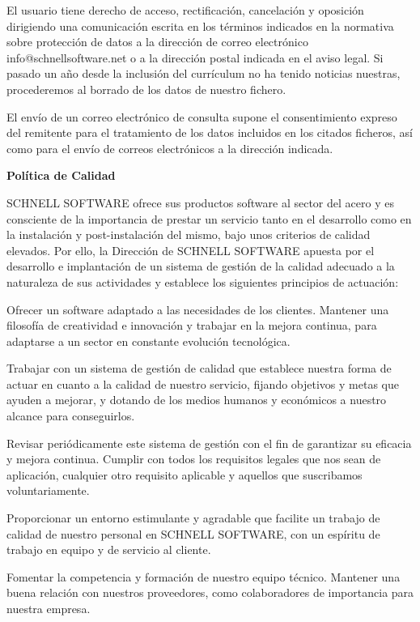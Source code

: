 \documentclass[10pt,a4paper]{article}
\begin{document}
\begin{enumerate}
El usuario tiene derecho de acceso, rectificación, cancelación y oposición dirigiendo una comunicación escrita en los términos indicados en la normativa sobre protección de datos a la dirección de correo electrónico info@schnellsoftware.net o a la dirección postal indicada en el aviso legal. Si pasado un año desde la inclusión del currículum no ha tenido noticias nuestras, procederemos al borrado de los datos de nuestro fichero.

El envío de un correo electrónico de consulta supone el consentimiento expreso del remitente para el tratamiento de los datos incluidos en los citados ficheros, así como para el envío de correos electrónicos a la dirección indicada.

\textbf{Política de Calidad}

SCHNELL SOFTWARE ofrece sus productos software al sector del acero y es consciente de la importancia de prestar un servicio tanto en el desarrollo como en la instalación y post-instalación del mismo, bajo unos criterios de calidad elevados.
Por ello, la Dirección de SCHNELL SOFTWARE apuesta por el desarrollo e implantación de un sistema de gestión de la calidad adecuado a la naturaleza de sus actividades y establece los siguientes principios de actuación:

Ofrecer un software adaptado a las necesidades de los clientes.
Mantener una filosofía de creatividad e innovación y trabajar en la mejora continua, para adaptarse a un sector en constante evolución tecnológica.

Trabajar con un sistema de gestión de calidad que establece nuestra forma de actuar en cuanto a la calidad de nuestro servicio, fijando objetivos y metas que ayuden a mejorar, y dotando de los medios humanos y económicos a nuestro alcance para conseguirlos.

Revisar periódicamente este sistema de gestión con el fin de garantizar su eficacia y mejora continua. 
Cumplir con todos los requisitos legales que nos sean de aplicación, cualquier otro requisito aplicable y aquellos que suscribamos voluntariamente.

Proporcionar un entorno estimulante y agradable que facilite un trabajo de calidad de nuestro personal en SCHNELL SOFTWARE, con un espíritu de trabajo en equipo y de servicio al cliente.

Fomentar la competencia y formación de nuestro equipo técnico.
Mantener una buena relación con nuestros proveedores, como colaboradores de importancia para nuestra empresa.


\end{enumerate}
\end{document}
